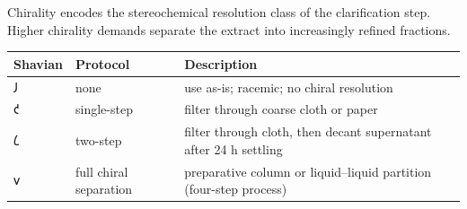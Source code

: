 \documentclass[12pt,a4paper]{article}
\begin{document}
Chirality encodes the stereochemical resolution class of the
clarification step. Higher chirality demands separate the extract into
increasingly refined fractions.

\begin{longtable}[]{@{}lll@{}}
\toprule
\begin{minipage}[b]{0.30\columnwidth}\raggedright
Shavian\strut
\end{minipage} & \begin{minipage}[b]{0.30\columnwidth}\raggedright
Protocol\strut
\end{minipage} & \begin{minipage}[b]{0.30\columnwidth}\raggedright
Description\strut
\end{minipage}\tabularnewline
\midrule
\endhead
\begin{minipage}[t]{0.30\columnwidth}\raggedright
𐑓\strut
\end{minipage} & \begin{minipage}[t]{0.30\columnwidth}\raggedright
none\strut
\end{minipage} & \begin{minipage}[t]{0.30\columnwidth}\raggedright
use as-is; racemic; no chiral resolution\strut
\end{minipage}\tabularnewline
\begin{minipage}[t]{0.30\columnwidth}\raggedright
𐑒\strut
\end{minipage} & \begin{minipage}[t]{0.30\columnwidth}\raggedright
single-step\strut
\end{minipage} & \begin{minipage}[t]{0.30\columnwidth}\raggedright
filter through coarse cloth or paper\strut
\end{minipage}\tabularnewline
\begin{minipage}[t]{0.30\columnwidth}\raggedright
𐑖\strut
\end{minipage} & \begin{minipage}[t]{0.30\columnwidth}\raggedright
two-step\strut
\end{minipage} & \begin{minipage}[t]{0.30\columnwidth}\raggedright
filter through cloth, then decant supernatant after 24 h settling\strut
\end{minipage}\tabularnewline
\begin{minipage}[t]{0.30\columnwidth}\raggedright
𐑫\strut
\end{minipage} & \begin{minipage}[t]{0.30\columnwidth}\raggedright
full chiral separation\strut
\end{minipage} & \begin{minipage}[t]{0.30\columnwidth}\raggedright
preparative column or liquid--liquid partition (four-step process)\strut
\end{minipage}\tabularnewline
\bottomrule
\end{longtable}
\end{document}
